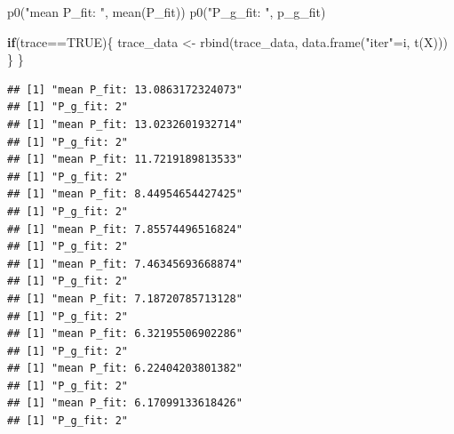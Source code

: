 \documentclass[
  oneside]{book}
\newenvironment{Shaded}{\begin{snugshade}}{\end{snugshade}}
\newcommand{\ConstantTok}[1]{\textcolor[rgb]{0.00,0.00,0.00}{#1}}
\newcommand{\ControlFlowTok}[1]{\textcolor[rgb]{0.13,0.29,0.53}{\textbf{#1}}}
\newcommand{\FunctionTok}[1]{\textcolor[rgb]{0.00,0.00,0.00}{#1}}
\newcommand{\NormalTok}[1]{#1}
\newcommand{\OtherTok}[1]{\textcolor[rgb]{0.56,0.35,0.01}{#1}}
\newcommand{\SpecialCharTok}[1]{\textcolor[rgb]{0.00,0.00,0.00}{#1}}
\newcommand{\StringTok}[1]{\textcolor[rgb]{0.31,0.60,0.02}{#1}}
\begin{document}
\begin{Shaded}
\begin{Highlighting}[]
  \FunctionTok{p0}\NormalTok{(}\StringTok{"mean P\_fit: "}\NormalTok{, }\FunctionTok{mean}\NormalTok{(P\_fit))}
  \FunctionTok{p0}\NormalTok{(}\StringTok{"P\_g\_fit: "}\NormalTok{, p\_g\_fit)}
  
  \ControlFlowTok{if}\NormalTok{(trace}\SpecialCharTok{==}\ConstantTok{TRUE}\NormalTok{)\{}
\NormalTok{    trace\_data }\OtherTok{\textless{}{-}} \FunctionTok{rbind}\NormalTok{(trace\_data, }\FunctionTok{data.frame}\NormalTok{(}\StringTok{"iter"}\OtherTok{=}\NormalTok{i, }\FunctionTok{t}\NormalTok{(X)))}
\NormalTok{  \}}
\NormalTok{\}}
\end{Highlighting}
\end{Shaded}

\begin{verbatim}
## [1] "mean P_fit: 13.0863172324073"
## [1] "P_g_fit: 2"
## [1] "mean P_fit: 13.0232601932714"
## [1] "P_g_fit: 2"
## [1] "mean P_fit: 11.7219189813533"
## [1] "P_g_fit: 2"
## [1] "mean P_fit: 8.44954654427425"
## [1] "P_g_fit: 2"
## [1] "mean P_fit: 7.85574496516824"
## [1] "P_g_fit: 2"
## [1] "mean P_fit: 7.46345693668874"
## [1] "P_g_fit: 2"
## [1] "mean P_fit: 7.18720785713128"
## [1] "P_g_fit: 2"
## [1] "mean P_fit: 6.32195506902286"
## [1] "P_g_fit: 2"
## [1] "mean P_fit: 6.22404203801382"
## [1] "P_g_fit: 2"
## [1] "mean P_fit: 6.17099133618426"
## [1] "P_g_fit: 2"
\end{verbatim}
\end{document}
